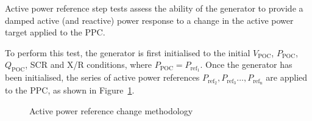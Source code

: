 Active power reference step tests assess the ability of the generator to provide a damped active (and reactive) power response to a change in the active power target applied to the PPC.

To perform this test, the generator is first initialised to the initial $V_{\mathrm{POC}}$, $P_{\mathrm{POC}}$, $Q_{\mathrm{POC}}$, SCR and X/R conditions, where $P_{\mathrm{POC}} = P_{\mathrm{ref}_{\mathrm{1}}}$. Once the generator has been initialised, the series of active power references $P_{\mathrm{ref}_{\mathrm{2}}}, P_{\mathrm{ref}_{\mathrm{3}}} \dots, P_{\mathrm{ref}_{\mathrm{n}}}$ are applied to the PPC, as shown in Figure~\ref{fig:smib-pref-change-methodology}.

\begin{figure}[h]
	\centering
	
	\caption{Active power reference change methodology}
	\label{fig:smib-pref-change-methodology}
\end{figure}